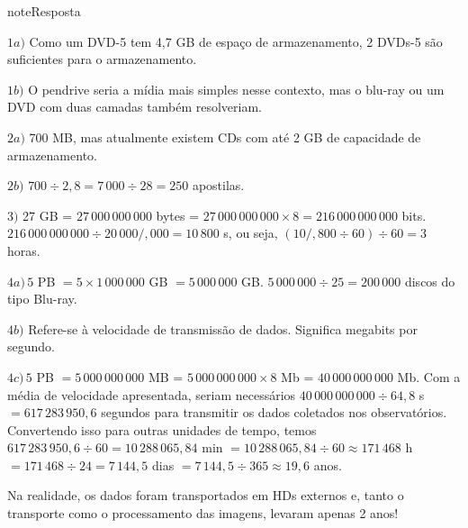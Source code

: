 \begin{sphinxadmonition}{note}{Resposta}

\(1a)\) Como um DVD-5 tem 4,7 GB de espaço de armazenamento, 2 DVDs-5 são suficientes para o armazenamento.

\(1b)\) O pendrive seria a mídia mais simples nesse contexto, mas o blu-ray ou um DVD com duas camadas também resolveriam.

\(2a)\) 700 MB, mas atualmente existem CDs com até 2 GB de capacidade de armazenamento.

\(2b)\,\, 700 \div 2,8 = 7\,000 \div 28 = 250\) apostilas.

\(3)\) 27 GB = \(27\,000\,000\,000\) bytes = \(27\,000\,000\,000 \times 8 = 216\,000\,000\,000\) bits. \(216\,000\,000\,000 \div 20\,000/,000 = 10\,800\) s, ou seja, \((10/,800 \div 60) \div 60 = 3\) horas.

\(4a) \, 5\) PB \(= 5\times 1\,000\,000\) GB \(= 5\,000\,000\) GB. \(5\,000\,000 \div 25 = 200\,000\) discos do tipo Blu-ray.

\(4b)\) Refere-se à velocidade de transmissão de dados. Significa megabits por segundo.

\(4c) \, 5\) PB \(=5\,000\,000\,000\) MB = \(5\,000\,000\,000 \times 8\) Mb = \(40\,000\,000\,000\) Mb. Com a média de velocidade apresentada, seriam necessários \(40\,000\,000\,000 \div 64,8\) s \(= 617\,283\,950,6\) segundos para transmitir os dados coletados nos observatórios. Convertendo isso para outras unidades de tempo, temos \(617\,283\,950,6 \div 60 = 10\,288\,065,84\) min \(= 10\,288\,065,84 \div 60 \approx 171\,468\) h \(= 171\,468 \div 24 = 7\,144,5\) dias \(= 7\,144,5 \div 365 \approx 19,6\) anos.

Na realidade, os dados foram transportados em HDs externos e, tanto o transporte como o processamento das imagens, levaram apenas 2 anos!
\end{sphinxadmonition}


